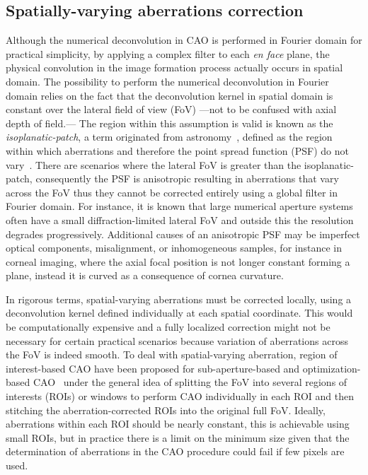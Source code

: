 \FloatBarrier

\subsection{Spatially-varying aberrations correction}

Although the numerical deconvolution in CAO is performed in Fourier domain for practical simplicity, by applying a complex filter to each \textit{en face} plane, the physical convolution in the image formation process actually occurs in spatial domain. The possibility to perform the numerical deconvolution in Fourier domain relies on the fact that the deconvolution kernel in spatial domain is constant over the lateral field of view (FoV) ---not to be confused with axial depth of field.--- The region within this assumption is valid is known as the \textit{isoplanatic-patch}, a term originated from astronomy~\cite{Beckers1993_Adaptive}, defined as the region within which aberrations and therefore the point spread function (PSF) do not vary~\cite{Kumar2015_Anisotropic}. There are scenarios where the lateral FoV is greater than the isoplanatic-patch, consequently the PSF is anisotropic resulting in aberrations that vary across the FoV thus they cannot be corrected entirely using a global filter in Fourier domain.  For instance, it is known that large numerical aperture systems often have a small diffraction-limited lateral FoV and outside this the resolution degrades progressively. Additional causes of an anisotropic PSF may be imperfect optical components, misalignment, or inhomogeneous samples, for instance in corneal imaging, where the axial focal position is not longer constant forming a plane, instead it is curved as a consequence of cornea curvature.

In rigorous terms, spatial-varying aberrations must be corrected locally, using a deconvolution kernel defined individually at each spatial coordinate. This would be computationally expensive and a fully localized correction might not be necessary for certain practical scenarios because variation of aberrations across the FoV is indeed smooth. To deal with spatial-varying aberration, region of interest-based CAO have been proposed for sub-aperture-based and optimization-based CAO~\cite{Kumar2015_Anisotropic, South2019_Local} under the general idea of splitting the FoV into several regions of interests (ROIs) or windows to perform CAO individually in each ROI and then stitching the aberration-corrected ROIs into the original full FoV. Ideally, aberrations within each ROI should be nearly constant, this is achievable using small ROIs, but in practice there is a limit on the minimum size given that the determination of aberrations in the CAO procedure could fail if few pixels are used.

